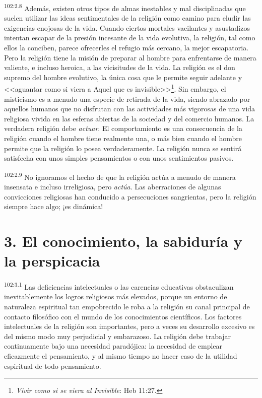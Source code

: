 \documentclass[twoside, 11pt]{book}
\begin{document}
\par
\textsuperscript{102:2.8} Además, existen otros tipos de almas inestables y mal disciplinadas que suelen utilizar las ideas sentimentales de la religión como camino para eludir las exigencias enojosas de la vida. Cuando ciertos mortales vacilantes y asustadizos intentan escapar de la presión incesante de la vida evolutiva, la religión, tal como ellos la conciben, parece ofrecerles el refugio más cercano, la mejor escapatoria. Pero la religión tiene la misión de preparar al hombre para enfrentarse de manera valiente, e incluso heroica, a las vicisitudes de la vida. La religión es el don supremo del hombre evolutivo, la única cosa que le permite seguir adelante y <<aguantar como si viera a Aquel que es invisible>>\footnote{\textit{Vivir como si se viera al Invisible}: Heb 11:27.}. Sin embargo, el misticismo es a menudo una especie de retirada de la vida, siendo abrazado por aquellos humanos que no disfrutan con las actividades más vigorosas de una vida religiosa vivida en las esferas abiertas de la sociedad y del comercio humanos. La verdadera religión debe \textit{actuar}. El comportamiento es una consecuencia de la religión cuando el hombre tiene realmente una, o más bien cuando el hombre permite que la religión lo posea verdaderamente. La religión nunca se sentirá satisfecha con unos simples pensamientos o con unos sentimientos pasivos.

\par
\textsuperscript{102:2.9} No ignoramos el hecho de que la religión actúa a menudo de manera insensata e incluso irreligiosa, pero \textit{actúa}. Las aberraciones de algunas convicciones religiosas han conducido a persecuciones sangrientas, pero la religión siempre hace algo; ¡es dinámica!

\section*{3. El conocimiento, la sabiduría y la perspicacia}
\par
\textsuperscript{102:3.1} Las deficiencias intelectuales o las carencias educativas obstaculizan inevitablemente los logros religiosos más elevados, porque un entorno de naturaleza espiritual tan empobrecido le roba a la religión su canal principal de contacto filosófico con el mundo de los conocimientos científicos. Los factores intelectuales de la religión son importantes, pero a veces su desarrollo excesivo es del mismo modo muy perjudicial y embarazoso. La religión debe trabajar continuamente bajo una necesidad paradójica: la necesidad de emplear eficazmente el pensamiento, y al mismo tiempo no hacer caso de la utilidad espiritual de todo pensamiento.
\end{document}
